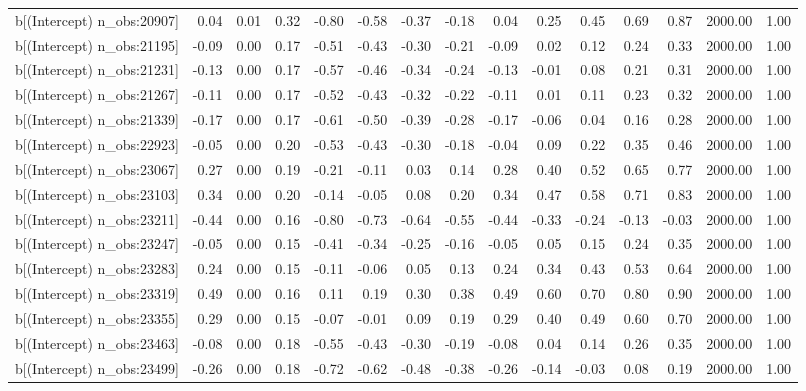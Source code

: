 \begin{table}[ht]
\begin{tabular}{rrrrrrrrrrrrrrr}
  b[(Intercept) n\_obs:20907] & 0.04 & 0.01 & 0.32 & -0.80 & -0.58 & -0.37 & -0.18 & 0.04 & 0.25 & 0.45 & 0.69 & 0.87 & 2000.00 & 1.00 \\ 
  b[(Intercept) n\_obs:21195] & -0.09 & 0.00 & 0.17 & -0.51 & -0.43 & -0.30 & -0.21 & -0.09 & 0.02 & 0.12 & 0.24 & 0.33 & 2000.00 & 1.00 \\ 
  b[(Intercept) n\_obs:21231] & -0.13 & 0.00 & 0.17 & -0.57 & -0.46 & -0.34 & -0.24 & -0.13 & -0.01 & 0.08 & 0.21 & 0.31 & 2000.00 & 1.00 \\ 
  b[(Intercept) n\_obs:21267] & -0.11 & 0.00 & 0.17 & -0.52 & -0.43 & -0.32 & -0.22 & -0.11 & 0.01 & 0.11 & 0.23 & 0.32 & 2000.00 & 1.00 \\ 
  b[(Intercept) n\_obs:21339] & -0.17 & 0.00 & 0.17 & -0.61 & -0.50 & -0.39 & -0.28 & -0.17 & -0.06 & 0.04 & 0.16 & 0.28 & 2000.00 & 1.00 \\ 
  b[(Intercept) n\_obs:22923] & -0.05 & 0.00 & 0.20 & -0.53 & -0.43 & -0.30 & -0.18 & -0.04 & 0.09 & 0.22 & 0.35 & 0.46 & 2000.00 & 1.00 \\ 
  b[(Intercept) n\_obs:23067] & 0.27 & 0.00 & 0.19 & -0.21 & -0.11 & 0.03 & 0.14 & 0.28 & 0.40 & 0.52 & 0.65 & 0.77 & 2000.00 & 1.00 \\ 
  b[(Intercept) n\_obs:23103] & 0.34 & 0.00 & 0.20 & -0.14 & -0.05 & 0.08 & 0.20 & 0.34 & 0.47 & 0.58 & 0.71 & 0.83 & 2000.00 & 1.00 \\ 
  b[(Intercept) n\_obs:23211] & -0.44 & 0.00 & 0.16 & -0.80 & -0.73 & -0.64 & -0.55 & -0.44 & -0.33 & -0.24 & -0.13 & -0.03 & 2000.00 & 1.00 \\ 
  b[(Intercept) n\_obs:23247] & -0.05 & 0.00 & 0.15 & -0.41 & -0.34 & -0.25 & -0.16 & -0.05 & 0.05 & 0.15 & 0.24 & 0.35 & 2000.00 & 1.00 \\ 
  b[(Intercept) n\_obs:23283] & 0.24 & 0.00 & 0.15 & -0.11 & -0.06 & 0.05 & 0.13 & 0.24 & 0.34 & 0.43 & 0.53 & 0.64 & 2000.00 & 1.00 \\ 
  b[(Intercept) n\_obs:23319] & 0.49 & 0.00 & 0.16 & 0.11 & 0.19 & 0.30 & 0.38 & 0.49 & 0.60 & 0.70 & 0.80 & 0.90 & 2000.00 & 1.00 \\ 
  b[(Intercept) n\_obs:23355] & 0.29 & 0.00 & 0.15 & -0.07 & -0.01 & 0.09 & 0.19 & 0.29 & 0.40 & 0.49 & 0.60 & 0.70 & 2000.00 & 1.00 \\ 
  b[(Intercept) n\_obs:23463] & -0.08 & 0.00 & 0.18 & -0.55 & -0.43 & -0.30 & -0.19 & -0.08 & 0.04 & 0.14 & 0.26 & 0.35 & 2000.00 & 1.00 \\ 
  b[(Intercept) n\_obs:23499] & -0.26 & 0.00 & 0.18 & -0.72 & -0.62 & -0.48 & -0.38 & -0.26 & -0.14 & -0.03 & 0.08 & 0.19 & 2000.00 & 1.00 \\ 

\end{tabular}
\end{table}

